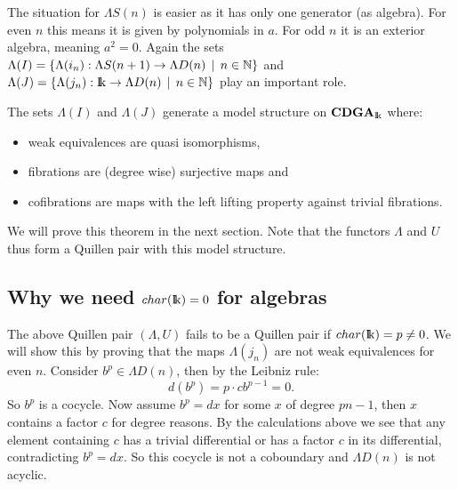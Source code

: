 The situation for $\Lambda S(n)$ is easier as it has only one generator (as algebra). For even $n$ this means it is given by polynomials in $a$. For odd $n$ it is an exterior algebra, meaning $a^2 = 0$. Again the sets $\Lambda(I) = \{ \Lambda(i_n) : \Lambda S(n+1) \to \Lambda D(n) \,\mid\, n \in \mathbb{N}\}$ and $\Lambda(J) = \{ \Lambda(j_n) : \mathrm{I\!k} \to \Lambda D(n) \,\mid\, n \in \mathbb{N}\}$ play an important role.

\begin{theorem}
	The sets $\Lambda(I)$ and $\Lambda(J)$ generate a model structure on $\mathbf{CDGA}_{\mathrm{I\!k}}$ where:
	\begin{itemize}
		\item weak equivalences are quasi isomorphisms,
		\item fibrations are (degree wise) surjective maps and
		\item cofibrations are maps with the left lifting property against trivial fibrations.
	\end{itemize}
\end{theorem}

We will prove this theorem in the next section. Note that the functors $\Lambda$ and $U$ thus form a Quillen pair with this model structure.

\subsection{Why we need $char({\mathrm{I\!k}}) = 0$ for algebras}
The above Quillen pair $(\Lambda, U)$ fails to be a Quillen pair if $char({\mathrm{I\!k}}) = p \neq 0$. We will show this by proving that the maps $\Lambda(j_n)$ are not weak equivalences for even $n$. Consider $b^p \in \Lambda D(n)$, then by the Leibniz rule:
$$ d(b^p) = p \cdot c b^{p-1} = 0. $$
So $b^p$ is a cocycle. Now assume $b^p = d x$ for some $x$ of degree $p n - 1$, then $x$ contains a factor $c$ for degree reasons. By the calculations above we see that any element containing $c$ has a trivial differential or has a factor $c$ in its differential, contradicting $b^p =  d x$. So this cocycle is not a coboundary and $\Lambda D(n)$ is not acyclic.
